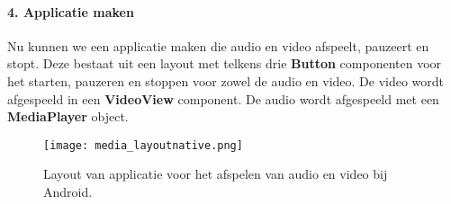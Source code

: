 \paragraph{4. Applicatie maken}
Nu kunnen we een applicatie maken die audio en video afspeelt, pauzeert en
stopt. Deze bestaat uit een layout met telkens drie \textbf{Button} componenten 
voor het starten, pauzeren en stoppen voor zowel de audio en video. De video 
wordt afgespeeld in een \textbf{VideoView} component. De audio wordt afgespeeld
met een \textbf{MediaPlayer} object.
\begin{figure}[H]
    \centering
    \texttt{[image: media\_layoutnative.png]}
    \caption{Layout van applicatie voor het afspelen van audio en video bij Android.}
\end{figure}




